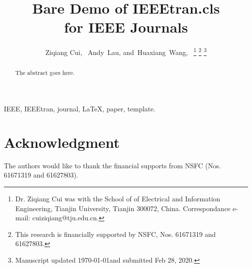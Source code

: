 \documentclass[journal, twocolumn]{IEEEtran}
\begin{document}
\title{Bare Demo of IEEEtran.cls\\ for IEEE Journals}


\author{
  Ziqiang Cui,~
  Andy~Lau, 
  and~Huaxiang~Wang,~%
\thanks{Dr. Ziqiang Cui was with the School of
of Electrical and Information Engineering, Tianjin University, Tianjin 300072, China.
Correspondance e-mail: cuiziqiang@tju.edu.cn.}%
\thanks{This research is financially supported by NSFC, Nos. 61671319 and 61627803.}%
\thanks{Manuscript updated \today and submitted Feb 28, 2020.}}

\maketitle

\begin{abstract}
The abstract goes here.
\end{abstract}

\begin{IEEEkeywords}
IEEE, IEEEtran, journal, \LaTeX, paper, template.
\end{IEEEkeywords}





\IEEEpeerreviewmaketitle








%

\section*{Acknowledgment}

The authors would like to thank the financial supports from NSFC (Nos. 61671319 and 61627803).

\ifCLASSOPTIONcaptionsoff
  \newpage
\fi





% 
\end{document}
